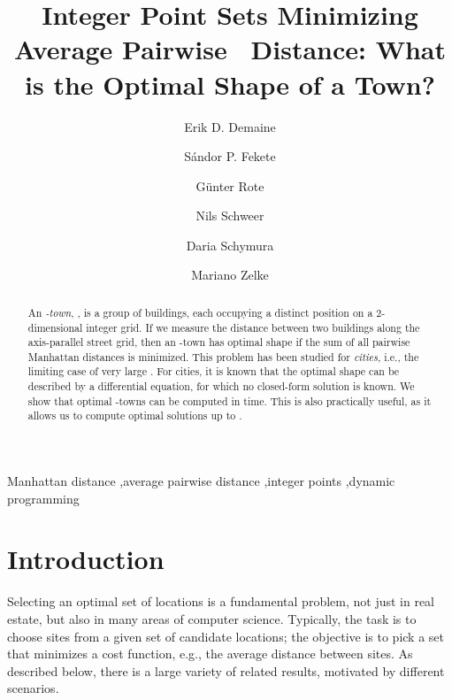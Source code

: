 \documentclass[preprint,authoryear,12pt]{elsarticle}
\begin{document}
\begin{frontmatter}





\title{Integer Point Sets Minimizing Average Pairwise
  ~Distance:
What is the Optimal Shape of a Town?}



\author[MIT]{Erik D. Demaine}
\author[TUBS]{S\'andor P. Fekete}
\author[FUB]{G\"{u}nter Rote}
\author[TUBS]{Nils Schweer}
\author[FUB]{\hspace{.45cm}Daria Schymura}
\author[GUF]{Mariano Zelke}

\address[MIT]{Computer Science and Artificial Intelligence Lab, MIT, USA.}
\address[TUBS]{Algorithms Group, Braunschweig University of Technology, Germany.}
\address[FUB]{Institut f\"ur Informatik, Freie Universit\" at Berlin, Germany.}
\address[GUF]{Institut f\"ur Informatik, Goethe-Universit\"at, Frankfurt am Main, Germany.}


\begin{abstract}
An {\em -town}, , is a group of  buildings,
each occupying a distinct position on a 2-dimensional integer grid.
If we measure the distance between two buildings along the
axis-parallel street grid, then an -town has optimal shape if the
sum of all pairwise Manhattan distances is minimized. This problem
has been studied for {\em cities}, i.e., the limiting case of very
large . For cities, it is known that the optimal shape can be
described by a differential equation, for which no closed-form
solution
is known. We show that optimal -towns
can be computed in  time. This is also practically
useful,
as it allows us to compute optimal solutions up to . \end{abstract}

\begin{keyword}
Manhattan distance \sep average pairwise distance \sep integer
points \sep dynamic programming
\end{keyword}

\end{frontmatter}







\section{Introduction}\label{sec:introduction}
Selecting an optimal set of locations is a fundamental problem, not
just in real estate, but also in many areas of computer science.
Typically, the task is to choose  sites from a given set
of candidate locations; the objective is to pick a set that minimizes
a cost function, e.g., the average distance
between sites. As described below, there is a large variety of related results,
motivated by different scenarios.
\end{document}
